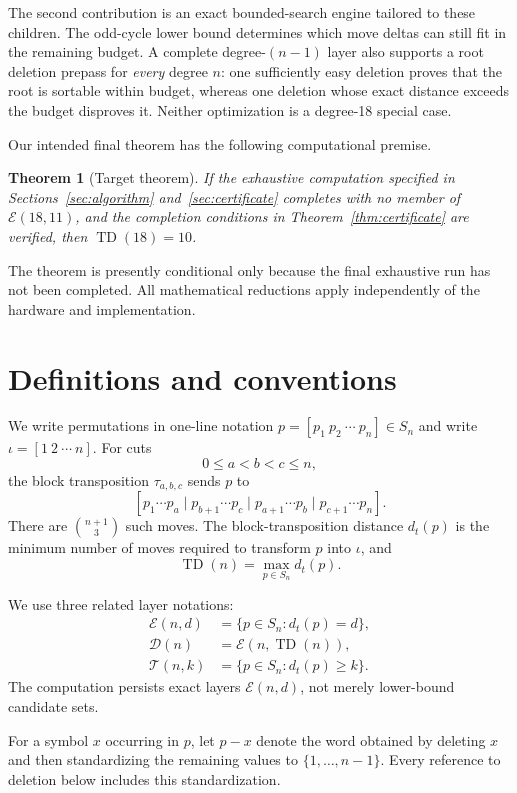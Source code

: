 \documentclass[11pt]{article}
\newtheorem{theorem}{Theorem}[section]
\theoremstyle{definition}
\theoremstyle{remark}
\newcommand{\TD}{\operatorname{TD}}
\newcommand{\dist}{d_t}
\newcommand{\E}{\mathcal E}
\newcommand{\D}{\mathcal D}
\newcommand{\T}{\mathcal T}
\newcommand{\id}{\iota}
\begin{document}
The second contribution is an exact bounded-search engine tailored to these
children.  The odd-cycle lower bound determines which move deltas can still
fit in the remaining budget.  A complete degree-$(n-1)$ layer also supports a
root deletion prepass for \emph{every} degree $n$: one sufficiently easy
deletion proves that the root is sortable within budget, whereas one deletion
whose exact distance exceeds the budget disproves it.  Neither optimization
is a degree-18 special case.

Our intended final theorem has the following computational premise.

\begin{theorem}[Target theorem]
\label{thm:target}
If the exhaustive computation specified in Sections~\ref{sec:algorithm}
and~\ref{sec:certificate} completes with no member of $\E(18,11)$, and the
completion conditions in Theorem~\ref{thm:certificate} are verified, then
$\TD(18)=10$.
\end{theorem}

The theorem is presently conditional only because the final exhaustive run
has not been completed.  All mathematical reductions apply independently of
the hardware and implementation.

\section{Definitions and conventions}
\label{sec:definitions}

We write permutations in one-line notation
$p=[p_1\ p_2\ \cdots\ p_n]\in S_n$ and write
$\id=[1\ 2\ \cdots\ n]$.  For cuts
\[
  0\leq a<b<c\leq n,
\]
the block transposition $\tau_{a,b,c}$ sends $p$ to
\[
 [p_1\cdots p_a\mid
   p_{b+1}\cdots p_c\mid
   p_{a+1}\cdots p_b\mid
   p_{c+1}\cdots p_n].
\]
There are $\binom{n+1}{3}$ such moves.  The block-transposition distance
$\dist(p)$ is the minimum number of moves required to transform $p$ into
$\id$, and
\[
  \TD(n)=\max_{p\in S_n}\dist(p).
\]

We use three related layer notations:
\begin{align*}
  \E(n,d)&=\{p\in S_n:\dist(p)=d\},\\
  \D(n)&=\E(n,\TD(n)),\\
  \T(n,k)&=\{p\in S_n:\dist(p)\geq k\}.
\end{align*}
The computation persists exact layers $\E(n,d)$, not merely lower-bound
candidate sets.

For a symbol $x$ occurring in $p$, let $p-x$ denote the word obtained by
deleting $x$ and then standardizing the remaining values to
$\{1,\ldots,n-1\}$.  Every reference to deletion below includes this
standardization.
\end{document}
